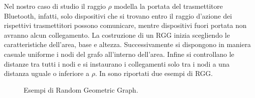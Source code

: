 Nel nostro caso di studio il raggio $\rho$ modella la portata del trasmettitore Bluetooth, infatti, solo dispositivi che si trovano entro il raggio d'azione dei rispettivi trasmettitori possono comunicare, mentre dispositivi fuori portata non avranno alcun collegamento. La costruzione di un \acs{RGG} inizia scegliendo le caratteristiche dell'area, base e altezza. Successivamente si dispongono in maniera casuale uniforme i nodi del grafo all'interno dell'area. Infine si controllano le distanze tra tutti i nodi e si instaurano i collegamenti solo tra i nodi a una distanza uguale o inferiore a $\rho$. In  sono riportati due esempi di \acs{RGG}.
\begin{figure}[t]
	\hfill
	\caption{Esempi di Random Geometric Graph.}
	\label{fig:rgg_gen}
\end{figure}
